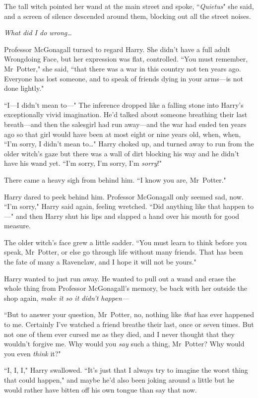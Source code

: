The tall witch pointed her wand at the main street and spoke, ``\emph{Quietus}" she said, and a screen of silence descended around them, blocking out all the street noises.

\emph{What did I do wrong…}

Professor McGonagall turned to regard Harry. She didn't have a full adult Wrongdoing Face, but her expression was flat, controlled. ``You must remember, Mr~Potter," she said, ``that there was a war in this country not ten years ago. Everyone has lost someone, and to speak of friends dying in your arms—is not done lightly."

``I—I didn't mean to—" The inference dropped like a falling stone into Harry's exceptionally vivid imagination. He'd talked about someone breathing their last breath—and then the salesgirl had run away—and the war had ended ten years ago so that girl would have been at most eight or nine years old, when, when, ``I'm sorry, I didn't mean to…" Harry choked up, and turned away to run from the older witch's gaze but there was a wall of dirt blocking his way and he didn't have his wand yet. ``I'm sorry, I'm sorry, I'm \emph{sorry}!"

There came a heavy sigh from behind him. ``I know you are, Mr~Potter."

Harry dared to peek behind him. Professor McGonagall only seemed sad, now. ``I'm sorry," Harry said again, feeling wretched. ``Did anything like that happen to—" and then Harry shut his lips and slapped a hand over his mouth for good measure.

The older witch's face grew a little sadder. ``You must learn to think before you speak, Mr~Potter, or else go through life without many friends. That has been the fate of many a Ravenclaw, and I hope it will not be yours."

Harry wanted to just run away. He wanted to pull out a wand and erase the whole thing from Professor McGonagall's memory, be back with her outside the shop again, \emph{make it so it didn't happen—}

``But to answer your question, Mr~Potter, no, nothing like \emph{that} has ever happened to me. Certainly I've watched a friend breathe their last, once or seven times. But not one of them ever cursed me as they died, and I never thought that they wouldn't forgive me. Why would you \emph{say} such a thing, Mr~Potter? Why would you even \emph{think} it?"

``I, I, I," Harry swallowed. ``It's just that I always try to imagine the worst thing that could happen," and maybe he'd also been joking around a little but he would rather have bitten off his own tongue than say that now.

